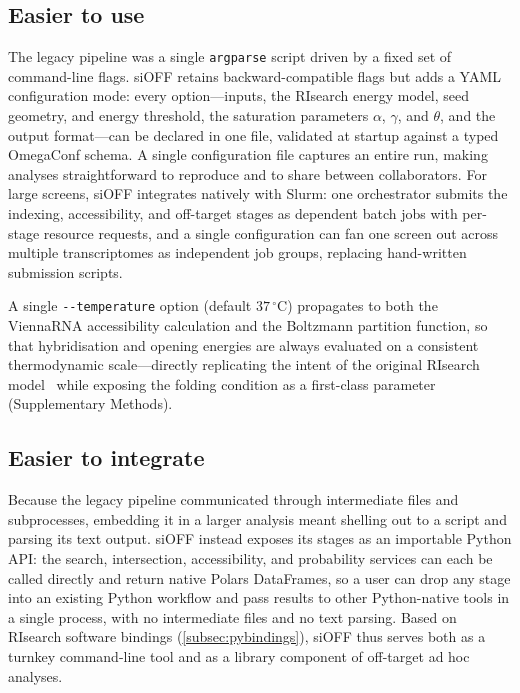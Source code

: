 \subsection*{Easier to use}
The legacy pipeline was a single \texttt{argparse} script driven by a fixed set of command-line flags.
siOFF retains backward-compatible flags but adds a YAML configuration mode: every option---inputs, the RIsearch energy model, seed geometry, and energy threshold, the saturation parameters $\alpha$, $\gamma$, and $\theta$, and the output format---can be declared in one file, validated at startup against a typed OmegaConf schema.
A single configuration file captures an entire run, making analyses straightforward to reproduce and to share between collaborators.
For large screens, siOFF integrates natively with Slurm: one orchestrator submits the indexing, accessibility, and off-target stages as dependent batch jobs with per-stage resource requests, and a single configuration can fan one screen out across multiple transcriptomes as independent job groups, replacing hand-written submission scripts.

A single \texttt{-{}-temperature} option (default $37\,^\circ$C) propagates to both the ViennaRNA accessibility calculation and the Boltzmann partition function, so that hybridisation and opening energies are always evaluated on a consistent thermodynamic scale---directly replicating the intent of the original RIsearch model~\citep{wenzel2012risearch} while exposing the folding condition as a first-class parameter (Supplementary Methods).

\subsection*{Easier to integrate}
Because the legacy pipeline communicated through intermediate files and subprocesses, embedding it in a larger analysis meant shelling out to a script and parsing its text output.
siOFF instead exposes its stages as an importable Python API: the search, intersection, accessibility, and probability services can each be called directly and return native Polars DataFrames, so a user can drop any stage into an existing Python workflow and pass results to other Python-native tools in a single process, with no intermediate files and no text parsing.
Based on RIsearch software bindings (\cref{subsec:pybindings}), siOFF thus serves both as a turnkey command-line tool and as a library component of off-target ad hoc analyses.

